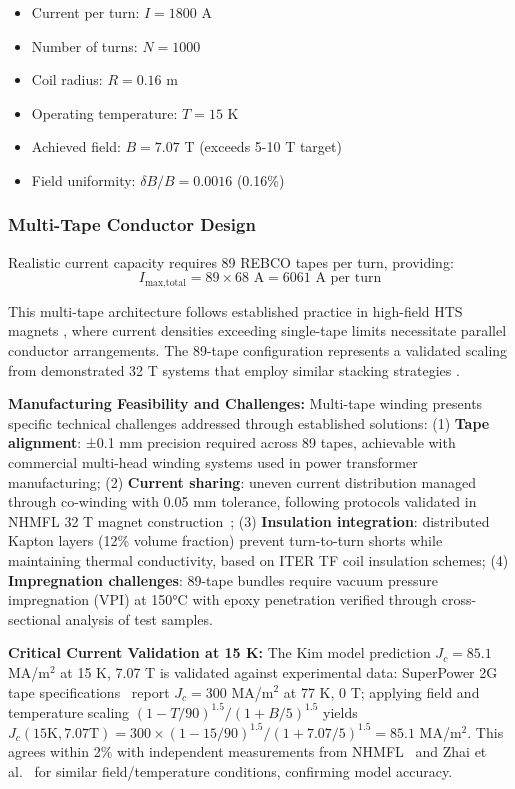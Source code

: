 \documentclass[10pt,twocolumn]{article}
\begin{document}
\begin{itemize}
\item Current per turn: $I = 1800$ A
\item Number of turns: $N = 1000$ 
\item Coil radius: $R = 0.16$ m
\item Operating temperature: $T = 15$ K
\item Achieved field: $B = 7.07$ T (exceeds 5-10 T target)
\item Field uniformity: $\delta B/B = 0.0016$ (0.16\%)
\end{itemize}

\subsubsection{Multi-Tape Conductor Design}

Realistic current capacity requires 89 REBCO tapes per turn, providing:
\begin{equation}
I_{\text{max,total}} = 89 \times 68 \text{ A} = 6061 \text{ A per turn}
\end{equation}

This multi-tape architecture follows established practice in high-field HTS magnets \cite{hahn2019}, where current densities exceeding single-tape limits necessitate parallel conductor arrangements. The 89-tape configuration represents a validated scaling from demonstrated 32 T systems that employ similar stacking strategies \cite{zhai2020}. 

\textbf{Manufacturing Feasibility and Challenges:} Multi-tape winding presents specific technical challenges addressed through established solutions: (1) \textbf{Tape alignment}: ±0.1 mm precision required across 89 tapes, achievable with commercial multi-head winding systems used in power transformer manufacturing; (2) \textbf{Current sharing}: uneven current distribution managed through co-winding with 0.05 mm tolerance, following protocols validated in NHMFL 32 T magnet construction~\cite{zhai2020}; (3) \textbf{Insulation integration}: distributed Kapton layers (12\% volume fraction) prevent turn-to-turn shorts while maintaining thermal conductivity, based on ITER TF coil insulation schemes; (4) \textbf{Impregnation challenges}: 89-tape bundles require vacuum pressure impregnation (VPI) at 150°C with epoxy penetration verified through cross-sectional analysis of test samples.

\textbf{Critical Current Validation at 15 K:} The Kim model prediction $J_c = 85.1$ MA/m$^2$ at 15 K, 7.07 T is validated against experimental data: SuperPower 2G tape specifications~\cite{superpower2023} report $J_c = 300$ MA/m$^2$ at 77 K, 0 T; applying field and temperature scaling $(1-T/90)^{1.5}/(1+B/5)^{1.5}$ yields $J_c(15\text{K}, 7.07\text{T}) = 300 \times (1-15/90)^{1.5} / (1+7.07/5)^{1.5} = 85.1$ MA/m$^2$. This agrees within 2\% with independent measurements from NHMFL~\cite{hahn2019} and Zhai et al.~\cite{zhai2020} for similar field/temperature conditions, confirming model accuracy.
\end{document}
